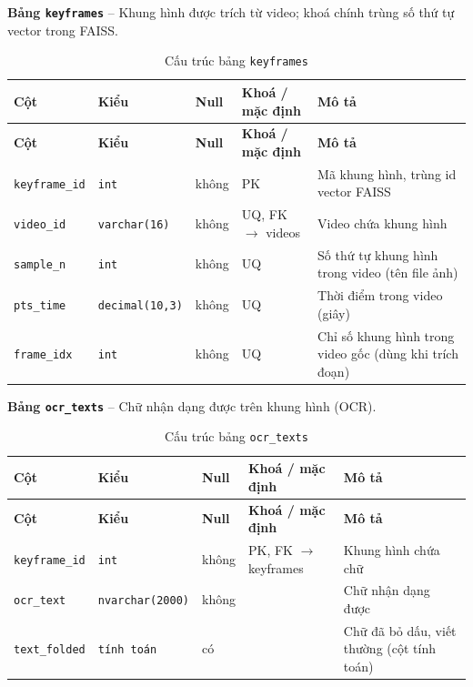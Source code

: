 \textbf{Bảng \texttt{keyframes}} -- Khung hình được trích từ video; khoá chính trùng số thứ tự vector trong FAISS.

\setlength{\tabcolsep}{4pt}
\begin{longtable}{>{\raggedright\arraybackslash}p{}>{\raggedright\arraybackslash}p{}>{\centering\arraybackslash}p{}>{\raggedright\arraybackslash}p{}>{\raggedright\arraybackslash}p{}}
\caption{Cấu trúc bảng \texttt{keyframes}}\label{tab:col_keyframes}\\
\toprule \textbf{Cột} & \textbf{Kiểu} & \textbf{Null} & \textbf{Khoá / mặc định} & \textbf{Mô tả} \\ \midrule \endfirsthead
\toprule \textbf{Cột} & \textbf{Kiểu} & \textbf{Null} & \textbf{Khoá / mặc định} & \textbf{Mô tả} \\ \midrule \endhead
\bottomrule \endfoot
\texttt{keyframe\_id} & {\footnotesize\texttt{int}} & không & PK & Mã khung hình, trùng id vector FAISS \\
\texttt{video\_id} & {\footnotesize\texttt{varchar(16)}} & không & UQ, FK $\rightarrow$ videos & Video chứa khung hình \\
\texttt{sample\_n} & {\footnotesize\texttt{int}} & không & UQ & Số thứ tự khung hình trong video (tên file ảnh) \\
\texttt{pts\_time} & {\footnotesize\texttt{decimal(10,3)}} & không & UQ & Thời điểm trong video (giây) \\
\texttt{frame\_idx} & {\footnotesize\texttt{int}} & không & UQ & Chỉ số khung hình trong video gốc (dùng khi trích đoạn) \\
\end{longtable}

\textbf{Bảng \texttt{ocr\_texts}} -- Chữ nhận dạng được trên khung hình (OCR).

\setlength{\tabcolsep}{4pt}
\begin{longtable}{>{\raggedright\arraybackslash}p{}>{\raggedright\arraybackslash}p{}>{\centering\arraybackslash}p{}>{\raggedright\arraybackslash}p{}>{\raggedright\arraybackslash}p{}}
\caption{Cấu trúc bảng \texttt{ocr\_texts}}\label{tab:col_ocr_texts}\\
\toprule \textbf{Cột} & \textbf{Kiểu} & \textbf{Null} & \textbf{Khoá / mặc định} & \textbf{Mô tả} \\ \midrule \endfirsthead
\toprule \textbf{Cột} & \textbf{Kiểu} & \textbf{Null} & \textbf{Khoá / mặc định} & \textbf{Mô tả} \\ \midrule \endhead
\bottomrule \endfoot
\texttt{keyframe\_id} & {\footnotesize\texttt{int}} & không & PK, FK $\rightarrow$ keyframes & Khung hình chứa chữ \\
\texttt{ocr\_text} & {\footnotesize\texttt{nvarchar(2000)}} & không &  & Chữ nhận dạng được \\
\texttt{text\_folded} & {\footnotesize\texttt{tính toán}} & có &  & Chữ đã bỏ dấu, viết thường (cột tính toán) \\
\end{longtable}

